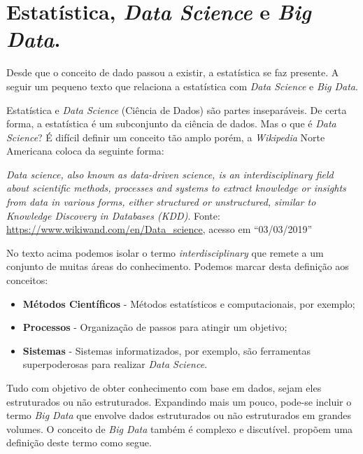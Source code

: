 \documentclass[12pt,]{style/krantz}
\providecommand{\tightlist}{%
  \setlength{\itemsep}{0pt}\setlength{\parskip}{0pt}}
\renewenvironment{quote}{\begin{VF}}{\end{VF}}
\theoremstyle{definition}
\theoremstyle{definition}
\theoremstyle{definition}
\theoremstyle{remark}
\begin{document}
\section{\texorpdfstring{Estatística, \emph{Data Science} e \emph{Big
Data}.}{Estatística, Data Science e Big Data.}}\label{estatistica-data-science-e-big-data.}

Desde que o conceito de dado passou a existir, a estatística se faz
presente. A seguir um pequeno texto que relaciona a estatística com
\emph{Data Science} e \emph{Big Data}.

Estatística e \emph{Data Science} (Ciência de Dados) são partes
inseparáveis. De certa forma, a estatística é um subconjunto da ciência
de dados. Mas o que é \emph{Data Science}? É difícil definir um conceito
tão amplo porém, a \emph{Wikipedia} Norte Americana coloca da seguinte
forma:

\begin{quote}
\emph{Data science, also known as data-driven science, is an
interdisciplinary field about scientific methods, processes and systems
to extract knowledge or insights from data in various forms, either
structured or unstructured, similar to Knowledge Discovery in Databases
(KDD)}. Fonte: \url{https://www.wikiwand.com/en/Data_science}, acesso em
``03/03/2019''
\end{quote}

No texto acima podemos isolar o termo \emph{interdisciplinary} que
remete a um conjunto de muitas áreas do conhecimento. Podemos marcar
desta definição aos conceitos:

\begin{itemize}
\tightlist
\item
  \textbf{Métodos Científicos} - Métodos estatísticos e computacionais,
  por exemplo;
\item
  \textbf{Processos} - Organização de passos para atingir um objetivo;
\item
  \textbf{Sistemas} - Sistemas informatizados, por exemplo, são
  ferramentas superpoderosas para realizar \emph{Data Science}.
\end{itemize}

Tudo com objetivo de obter conhecimento com base em dados, sejam eles
estruturados ou não estruturados. Expandindo mais um pouco, pode-se
incluir o termo \emph{Big Data} que envolve dados estruturados ou não
estruturados em grandes volumes. O conceito de \emph{Big Data} também é
complexo e discutível. \citep{de2016formal} propõem uma definição deste
termo como segue.
\end{document}
